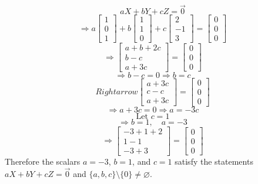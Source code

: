 \documentclass{article}
\begin{document}
	$$aX+bY+cZ=\vec{0}$$
	$$\Rightarrow a\begin{bmatrix}1\\0\\1\end{bmatrix}+b\begin{bmatrix}1\\1\\0\end{bmatrix}+c\begin{bmatrix}2\\-1\\3\end{bmatrix}=\begin{bmatrix}0\\0\\0\end{bmatrix}$$
	$$\Rightarrow\begin{bmatrix}a+b+2c\\b-c\\a+3c\end{bmatrix}=\begin{bmatrix}0\\0\\0\end{bmatrix}$$
	$$\Rightarrow b-c=0\Rightarrow b=c$$
	$$Rightarrow\begin{bmatrix}a+3c\\c-c\\a+3c\end{bmatrix}=\begin{bmatrix}0\\0\\0\end{bmatrix}$$
	$$\Rightarrow a+3c=0\Rightarrow a=-3c$$
	$$\text{Let }c=1$$
	$$\Rightarrow b=1,\quad a=-3$$
	$$\Rightarrow\begin{bmatrix}-3+1+2\\1-1\\-3+3\end{bmatrix}=\begin{bmatrix}0\\0\\0\end{bmatrix}$$
Therefore the scalars $a=-3$, $b=1$, and $c=1$ satisfy the statements $aX+bY+cZ=\vec{0}$ and $\{a,b,c\}\setminus\{0\}\neq\varnothing$.
\end{document}
